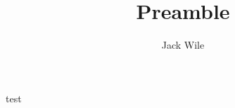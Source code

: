 \documentclass[12pt]{article}
\title{Preamble}
\author{Jack Wile}
\date{}
\begin{document}
test
\end{document}
